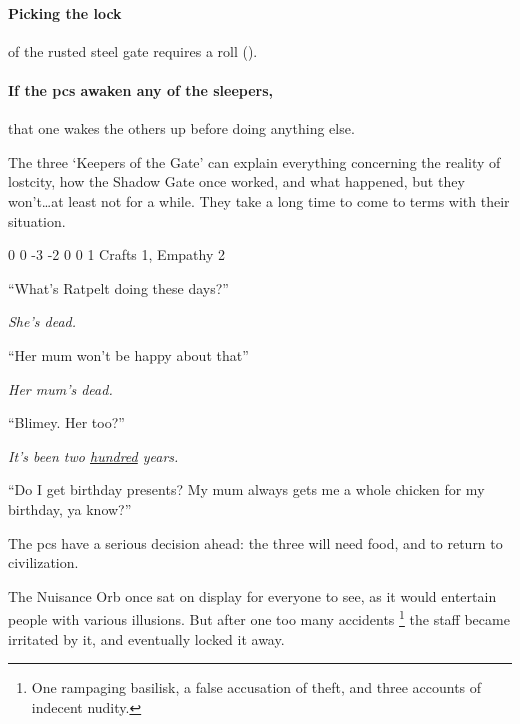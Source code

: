 \paragraph{Picking the lock}
of the rusted steel gate requires a  roll (\tn[16]).

\paragraph{If the \glspl{pc} awaken any of the sleepers,}
that one wakes the others up before doing anything else.

The three `Keepers of the Gate' can explain everything concerning the reality of \gls{lostcity}, how the Shadow Gate once worked, and what happened, but they won't\ldots at least not for a while.
They take a long time to come to terms with their situation.

\setcounter{Intelligence}{-2}
{0}%
{0}%
{{-3}%
{-2}%
{0}}%
{0}%
{1}%
{Crafts 1, Empathy 2}%
{\Dagger}%
{}

\begin{speechtext}
  ``What's Ratpelt doing these days?''

  \textit{\raggedleft{} She's dead.}

  ``Her mum won't be happy about that''

  \textit{\raggedleft{} Her mum's dead.}

  ``Blimey. Her too?''

  \textit{\raggedleft{} It's been two \underline{hundred} years.}

  ``Do I get birthday presents?
  My mum always gets me a whole chicken for my birthday, ya know?''
\end{speechtext}

The \glspl{pc} have a serious decision ahead: the three will need food, and to return to civilization.


\begin{exampletext}
  The Nuisance Orb once sat on display for everyone to see, as it would entertain people with various illusions.
  But after one too many accidents%
  \footnote{One rampaging basilisk, a false accusation of theft, and three accounts of indecent nudity.}
  the staff became irritated by it, and eventually locked it away.
\end{exampletext}

